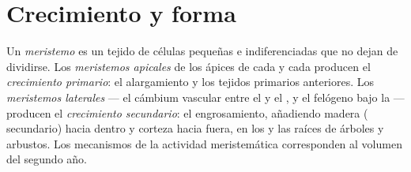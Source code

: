 \section{Crecimiento y forma}

\begin{definition}\label{def:b1:flowering-plant-organization:meristem}
Un \emph{meristemo} es un tejido de células pequeñas e
indiferenciadas que no dejan de dividirse. Los \emph{meristemos
apicales} de los ápices de cada  y cada 
producen el \emph{crecimiento primario}: el
alargamiento y los tejidos primarios anteriores. Los \emph{meristemos
laterales} --- el cámbium vascular entre el 
y el , y el felógeno bajo la  --- producen el
\emph{crecimiento secundario}: el
engrosamiento, añadiendo madera ( secundario) hacia dentro y corteza
hacia fuera, en los  y las raíces de árboles y arbustos. Los
mecanismos de la actividad meristemática corresponden al volumen del segundo
año.
\end{definition}

